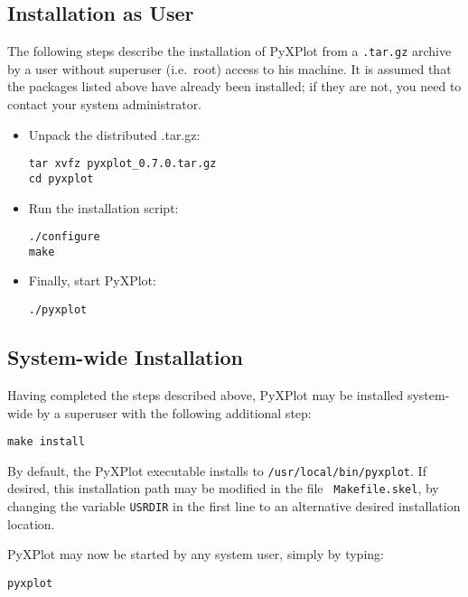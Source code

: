 \subsection{Installation as User}

The following steps describe the installation of PyXPlot from a {\tt .tar.gz}
archive by a user without superuser (i.e.\ root) access to his machine. It is
assumed that the packages listed above have already been installed; if they are
not, you need to contact your system administrator.

\begin{itemize}
\item Unpack the distributed .tar.gz:

\begin{verbatim}
tar xvfz pyxplot_0.7.0.tar.gz
cd pyxplot
\end{verbatim}

\item Run the installation script:

\begin{verbatim}
./configure
make
\end{verbatim}

\item Finally, start PyXPlot:

\begin{verbatim}
./pyxplot
\end{verbatim}

\end{itemize}

\subsection{System-wide Installation}

Having completed the steps described above, PyXPlot may be installed
system-wide by a superuser with the following additional step:

\begin{verbatim}
make install
\end{verbatim}

By default, the PyXPlot executable installs to {\tt /usr/local/bin/pyxplot}.
If desired, this installation path may be modified in the file {\tt
Makefile.skel}, by changing the variable {\tt USRDIR} in the first line to an
alternative desired installation location.

PyXPlot may now be started by any system user, simply by typing:

\begin{verbatim}
pyxplot
\end{verbatim}


